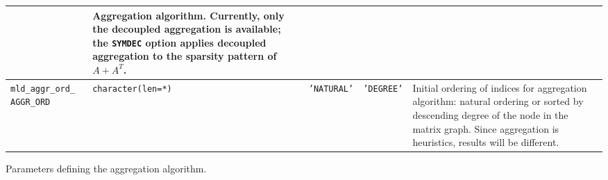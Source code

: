 \begin{center}
\begin{tabular}{|p{5cm}|l|p{2.4cm}|p{2.4cm}|p{6cm}|}
                         & Aggregation algorithm. Currently, only the
                         decoupled aggregation is available; the
                           \verb|SYMDEC| option  applies decoupled
                           aggregation to  the sparsity pattern
                           of $A+A^T$.\\ \hline 
\verb|mld_aggr_ord_|  \break \verb|AGGR_ORD|  & \verb|character(len=*)|
                         & \texttt{'NATURAL'}
                         & \texttt{'DEGREE'}
                         & Initial ordering of indices for aggregation
                            algorithm: natural ordering or sorted by
                            descending degree of the node in the
                            matrix graph. Since aggregation is
                            heuristics, results will be different. \\ \hline 
\hline
\end{tabular}
\end{center}
\caption{Parameters defining the aggregation algorithm.
\label{tab:p_aggregation}} 
\esideways


